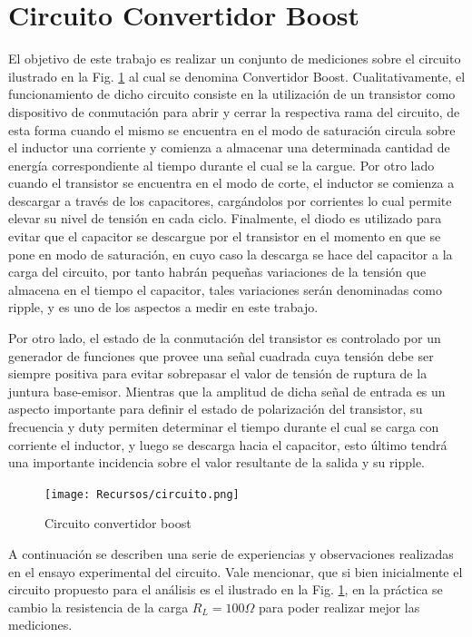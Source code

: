 \section{Circuito Convertidor Boost}
El objetivo de este trabajo es realizar un conjunto de mediciones sobre el circuito ilustrado en la Fig. \ref{fig:circuito}
al cual se denomina Convertidor Boost. Cualitativamente, el funcionamiento de dicho circuito consiste en la utilizaci\'on de un transistor como dispositivo de conmutaci\'on
para abrir y cerrar la respectiva rama del circuito, de esta forma cuando el mismo se encuentra en el modo de saturaci\'on circula sobre el inductor una corriente y comienza a almacenar una
determinada cantidad de energ\'ia correspondiente al tiempo durante el cual se la cargue. Por otro lado cuando el transistor se encuentra en el modo de corte, el inductor se comienza a descargar
a trav\'es de los capacitores, carg\'andolos por corrientes lo cual permite elevar su nivel de tensi\'on en cada ciclo.
Finalmente, el diodo es utilizado para evitar que el capacitor se descargue por el transistor en el momento en que se pone en modo de saturaci\'on, en cuyo caso la descarga se hace del capacitor a la carga del circuito,
por tanto habr\'an peque\~nas variaciones de la tensi\'on que almacena en el tiempo el capacitor, tales variaciones ser\'an denominadas como ripple, y es uno de los aspectos a medir en este trabajo.

Por otro lado, el estado de la conmutaci\'on del transistor es controlado por un generador de funciones que provee una se\~nal cuadrada cuya tensi\'on debe ser siempre positiva para evitar sobrepasar
el valor de tensi\'on de ruptura de la juntura base-emisor. Mientras que la amplitud de dicha se\~nal de entrada es un aspecto importante para definir el estado de polarizaci\'on del transistor, su frecuencia y duty
permiten determinar el tiempo durante el cual se carga con corriente el inductor, y luego se descarga hacia el capacitor, esto \'ultimo tendr\'a una importante incidencia sobre el valor resultante de la salida y su ripple.

\begin{figure}[H]
    \centering
    \texttt{[image: Recursos/circuito.png]}
    \caption{Circuito convertidor boost}
    \label{fig:circuito}
\end{figure}

A continuaci\'on se describen una serie de experiencias y observaciones realizadas en el ensayo experimental del circuito. Vale mencionar,
que si bien inicialmente el circuito propuesto para el an\'alisis es el ilustrado en la Fig. \ref{fig:circuito}, en la pr\'actica se cambio la resistencia
de la carga $R_L = 100 \Omega$ para poder realizar mejor las mediciones.

